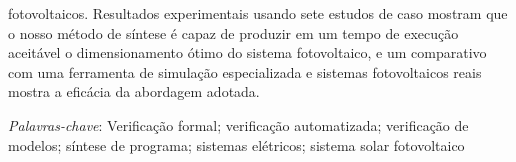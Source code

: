 fotovoltaicos. Resultados experimentais usando sete estudos de caso mostram que o nosso método de síntese é capaz de produzir em um tempo de execução aceitável o dimensionamento ótimo do sistema fotovoltaico, e um comparativo com uma ferramenta de simulação especializada e sistemas fotovoltaicos reais mostra a eficácia da abordagem adotada.

\textit{Palavras-chave}: Verificação formal; verificação automatizada; verificação de modelos; síntese de programa; sistemas elétricos; sistema solar fotovoltaico